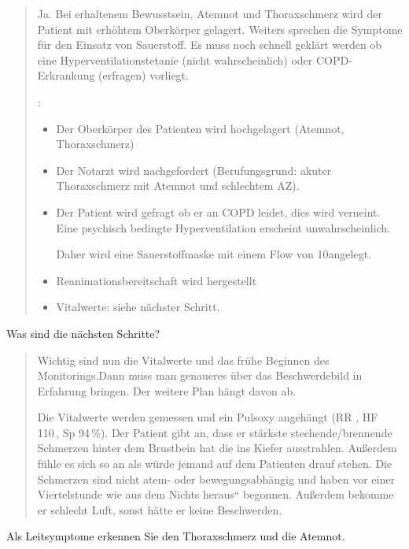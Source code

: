 \begin{quote}
  \marginlabel{\TxMassVit}Ja.  Bei erhaltenem Bewusstsein, Atemnot und
  Thoraxschmerz wird der Patient mit erhöhtem Oberkörper gelagert. Weiters sprechen
  die Symptome für den Einsatz von Sauerstoff. Es muss noch schnell geklärt werden
  ob eine Hyperventilationstetanie (nicht wahrscheinlich) oder COPD-Erkrankung
  (erfragen) vorliegt.
  
  \TxMassVit:
  
  \begin{itemize}
    \item Der Oberkörper des Patienten wird hochgelagert (Atemnot,
    Thoraxschmerz)
    \item Der Notarzt wird nachgefordert (Berufungsgrund: akuter
    Thoraxschmerz mit Atemnot und schlechtem AZ).
    \item Der Patient wird gefragt ob er an COPD leidet, dies wird verneint.
    Eine psychisch bedingte Hyperventilation erscheint unwahrscheinlich.
    
    Daher wird eine Sauerstoffmaske mit einem Flow von 10\LMin angelegt.
    \item Reanimationsbereitschaft wird hergestellt
    \item Vitalwerte: siehe nächster Schritt.
  \end{itemize}
  
\end{quote}


Was sind die nächsten Schritte?

\begin{quote}
  Wichtig sind
  nun die Vitalwerte und das frühe Beginnen des Monitorings.Dann muss man
  genaueres über das Beschwerdebild in Erfahrung bringen. Der weitere Plan hängt davon ab.
  
  Die Vitalwerte werden gemessen und ein Pulsoxy angehängt (RR
  , HF 110\,, Sp 94\,\%). Der Patient
  gibt an, dass er stärkste stechende/brennende Schmerzen hinter dem Brustbein hat die ins Kiefer
  ausstrahlen. Außerdem fühle es sich so an als würde jemand auf dem
  Patienten drauf stehen. Die Schmerzen sind nicht atem- oder
  bewegungsabhängig  und haben vor einer Viertelstunde
  {\quotedblbase}wie aus dem Nichts heraus{\textquotedblleft} begonnen.
  Außerdem bekomme er schlecht Luft, sonst hätte er keine Beschwerden.
\end{quote}

Als Leitsymptome erkennen Sie den
Thoraxschmerz und die Atemnot.

